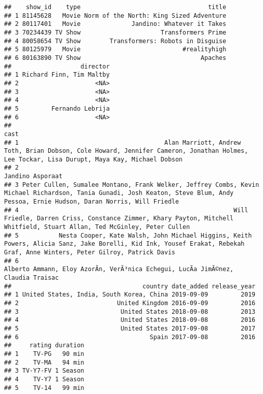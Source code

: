 \documentclass[]{article}
\begin{document}
\begin{verbatim}
##    show_id    type                                   title
## 1 81145628   Movie Norm of the North: King Sized Adventure
## 2 80117401   Movie              Jandino: Whatever it Takes
## 3 70234439 TV Show                      Transformers Prime
## 4 80058654 TV Show        Transformers: Robots in Disguise
## 5 80125979   Movie                            #realityhigh
## 6 80163890 TV Show                                 Apaches
##                   director
## 1 Richard Finn, Tim Maltby
## 2                     <NA>
## 3                     <NA>
## 4                     <NA>
## 5         Fernando Lebrija
## 6                     <NA>
##                                                                                                                                                                                 cast
## 1                                        Alan Marriott, Andrew Toth, Brian Dobson, Cole Howard, Jennifer Cameron, Jonathan Holmes, Lee Tockar, Lisa Durupt, Maya Kay, Michael Dobson
## 2                                                                                                                                                                   Jandino Asporaat
## 3 Peter Cullen, Sumalee Montano, Frank Welker, Jeffrey Combs, Kevin Michael Richardson, Tania Gunadi, Josh Keaton, Steve Blum, Andy Pessoa, Ernie Hudson, Daran Norris, Will Friedle
## 4                                                           Will Friedle, Darren Criss, Constance Zimmer, Khary Payton, Mitchell Whitfield, Stuart Allan, Ted McGinley, Peter Cullen
## 5           Nesta Cooper, Kate Walsh, John Michael Higgins, Keith Powers, Alicia Sanz, Jake Borelli, Kid Ink, Yousef Erakat, Rebekah Graf, Anne Winters, Peter Gilroy, Patrick Davis
## 6                                                                                                  Alberto Ammann, Eloy AzorÃ­n, VerÃ³nica Echegui, LucÃ­a JimÃ©nez, Claudia Traisac
##                                    country date_added release_year
## 1 United States, India, South Korea, China 2019-09-09         2019
## 2                           United Kingdom 2016-09-09         2016
## 3                            United States 2018-09-08         2013
## 4                            United States 2018-09-08         2016
## 5                            United States 2017-09-08         2017
## 6                                    Spain 2017-09-08         2016
##     rating duration
## 1    TV-PG   90 min
## 2    TV-MA   94 min
## 3 TV-Y7-FV 1 Season
## 4    TV-Y7 1 Season
## 5    TV-14   99 min

\end{verbatim}
\end{document}
